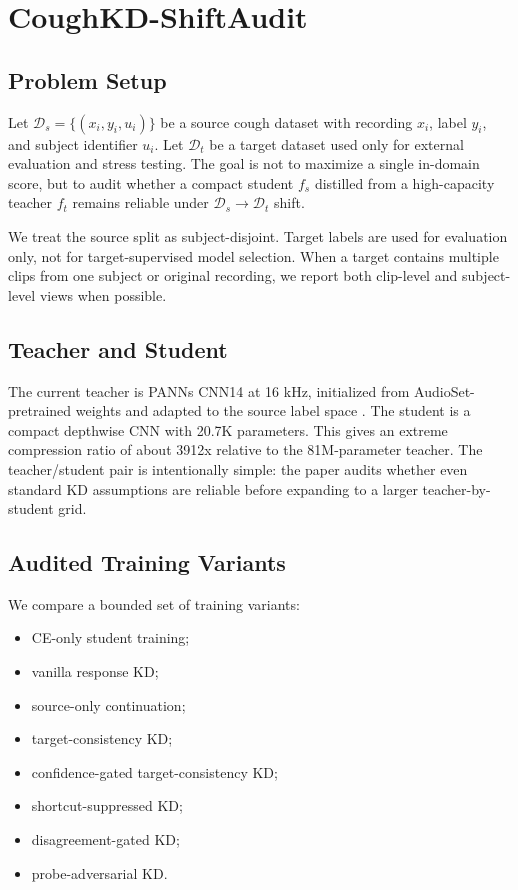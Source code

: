 \section{CoughKD-ShiftAudit}
\label{sec:method}

\subsection{Problem Setup}

Let $\mathcal{D}_s=\{(x_i,y_i,u_i)\}$ be a source cough dataset with recording $x_i$, label $y_i$, and subject identifier $u_i$. Let $\mathcal{D}_t$ be a target dataset used only for external evaluation and stress testing. The goal is not to maximize a single in-domain score, but to audit whether a compact student $f_s$ distilled from a high-capacity teacher $f_t$ remains reliable under $\mathcal{D}_s \rightarrow \mathcal{D}_t$ shift.

We treat the source split as subject-disjoint. Target labels are used for evaluation only, not for target-supervised model selection. When a target contains multiple clips from one subject or original recording, we report both clip-level and subject-level views when possible.

\subsection{Teacher and Student}

The current teacher is PANNs CNN14 at 16 kHz, initialized from AudioSet-pretrained weights and adapted to the source label space \cite{kong2020panns}. The student is a compact depthwise CNN with 20.7K parameters. This gives an extreme compression ratio of about 3912x relative to the 81M-parameter teacher. The teacher/student pair is intentionally simple: the paper audits whether even standard KD assumptions are reliable before expanding to a larger teacher-by-student grid.

\subsection{Audited Training Variants}

We compare a bounded set of training variants:
\begin{itemize}
    \item CE-only student training;
    \item vanilla response KD;
    \item source-only continuation;
    \item target-consistency KD;
    \item confidence-gated target-consistency KD;
    \item shortcut-suppressed KD;
    \item disagreement-gated KD;
    \item probe-adversarial KD.
\end{itemize}

